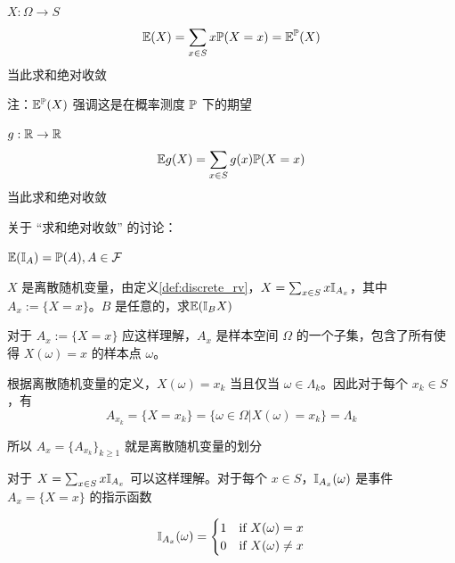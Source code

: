 \begin{definition}[$X$的期望]\label{def:E(x)}
    $X:\Omega\rightarrow S$
    \[
    \mathbb E(X)=\sum_{x\in S}x\mathbb{P}(X=x)=\mathbb E^{\mathbb{P}}(X)
    \]
    当此求和绝对收敛

    注：$\mathbb E^{\mathbb{P}}(X)$ 强调这是在概率测度 $\mathbb{P}$ 下的期望
\end{definition}

\begin{definition}[$g(X)$的期望]
    $g:\mathbb{R}\rightarrow \mathbb{R}$
    \[
    \mathbb E g(X)=\sum_{x\in S}g(x)\mathbb{P}(X=x)
    \]
    当此求和绝对收敛
\end{definition}

关于 “求和绝对收敛” 的讨论：

\begin{example}
    $\mathbb E(\mathbb I_A)=\mathbb{P}(A), A\in \mathcal{F}$
\end{example}

\begin{example}\label{exa:expec_of_indica}
    $X$ 是离散随机变量，由定义\ref{def:discrete_rv}，$X=\sum_{x\in S}x\mathbb I_{A_x}$，其中 $A_x:=\{X=x\}$。$B$ 是任意的，求$\mathbb E(\mathbb I_B X)$
\end{example}

\begin{remark}
对于 $A_x:=\{X=x\}$ 应这样理解，$A_x$ 是样本空间 $\Omega$ 的一个子集，包含了所有使得 $X(\omega)=x$ 的样本点 $\omega$。

根据离散随机变量的定义，$X(\omega)=x_k$ 当且仅当 $\omega\in \Lambda_k$。因此对于每个 $x_k\in S$，有
\[
A_{x_k}=\{X=x_k\}=\{\omega\in \Omega|X(\omega)=x_k\}=\Lambda_k
\]

所以 $A_x=\{A_{x_k}\}_{k\geq 1}$ 就是离散随机变量的划分

对于 $X=\sum_{x\in S}x\mathbb I_{A_x}$ 可以这样理解。对于每个 $x\in S$，$\mathbb I_{A_x}(\omega)$ 是事件 $A_x=\{X=x\}$ 的指示函数

\[
    \mathbb I_{A_x}(\omega)=\begin{cases}
        1 & \text{if } X(\omega)=x\\
        0 & \text{if } X(\omega)\neq x
    \end{cases}
\]
\end{remark}

